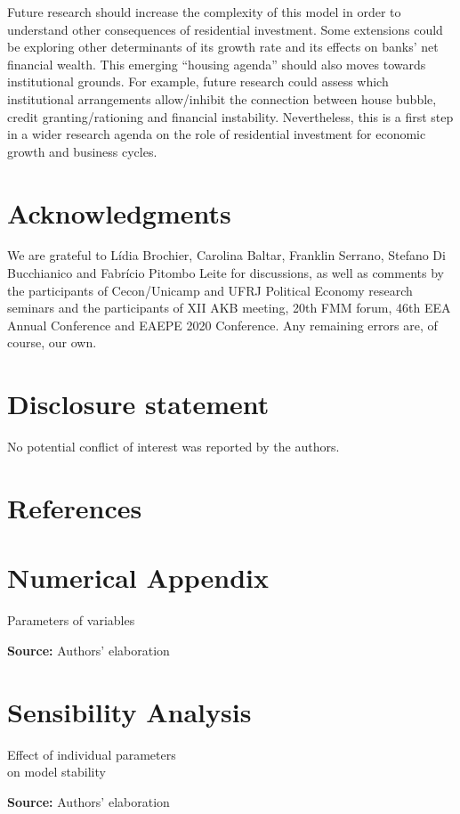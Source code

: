 \documentclass[11pt]{article}
\begin{document}
Future research should increase the complexity of this model in order to understand other consequences of residential investment.
Some extensions could be exploring other determinants of its growth rate and  its effects on banks' net financial wealth.
This emerging ``housing agenda'' should also moves towards institutional grounds.
For example, future research could assess which institutional arrangements allow/inhibit the connection between house bubble, credit granting/rationing and financial instability.
Nevertheless, this is a first step in a wider research agenda on the role of residential investment for economic growth and business cycles. 


\section*{Acknowledgments}
\label{sec:orgc76b383}
\noindent We  are  grateful  to  Lídia  Brochier,  Carolina  Baltar,  Franklin  Serrano, Stefano Di Bucchianico  and Fabrício Pitombo Leite for  discussions,  as  well  as  comments  by  the participants of Cecon/Unicamp and UFRJ Political Economy research seminars and the participants of XII AKB meeting, 20th FMM forum, 46th EEA Annual Conference and EAEPE 2020 Conference. Any remaining errors are, of course, our own.

\section*{Disclosure statement}
\label{sec:orgb7ad419}
No potential conflict of interest was reported by the authors.


\section*{References}
\label{sec:org38702b5}
\printbibliography[heading=none]


\appendix

\section{Numerical Appendix}
\label{sec:org7a1ac3a}
\label{append:Data}


\begin{table}[H]
\caption{Parameters of variables}
\centering
\label{tab:param}

\caption*{\textbf{Source:} Authors' elaboration}
\end{table}

\section{Sensibility Analysis}
\label{sec:orgbe63ea6}
\label{append:Sensib}
\begin{table}[H]
\caption{Effect of individual parameters\\on model stability}
\label{tab:sensibility}
\centering

\caption*{\textbf{Source:} Authors' elaboration}
\end{table}
\end{document}
